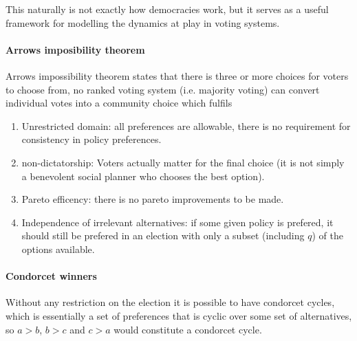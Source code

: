 This naturally is not exactly how democracies work, but it serves as a useful framework for modelling the dynamics at play in voting systems. 

\paragraph{Arrows imposibility theorem}
Arrows impossibility theorem states that there is three or more choices for voters to choose from, no ranked voting system (i.e. majority voting) can convert individual votes into a community choice which fulfils 

\begin{enumerate}
  \item Unrestricted domain: all preferences are allowable, there is no requirement for consistency in policy preferences. 
  \item non-dictatorship: Voters actually matter for the final choice (it is not simply a benevolent social planner who chooses the best option).
  \item Pareto efficency: there is no pareto improvements to be made. 
  \item Independence of irrelevant alternatives: if some given policy is prefered, it should still be prefered in an election with only a subset (including $q$) of the options available.
\end{enumerate}

\paragraph{Condorcet winners} Without any restriction on the election it is possible to have condorcet cycles, which is essentially a set of preferences that is cyclic over some set of alternatives, so $a>b$, $b>c$ and $c>a$ would constitute a condorcet cycle.

